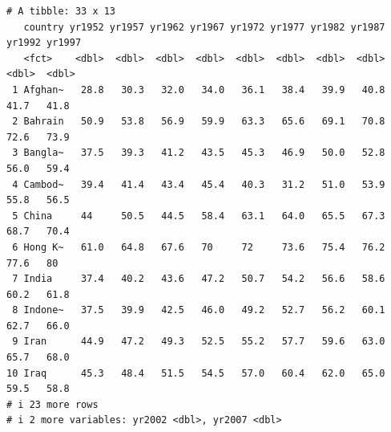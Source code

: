 \documentclass[
  letterpaper,
  DIV=11,
  numbers=noendperiod]{scrartcl}
\begin{document}
\begin{verbatim}
# A tibble: 33 x 13
   country yr1952 yr1957 yr1962 yr1967 yr1972 yr1977 yr1982 yr1987 yr1992 yr1997
   <fct>    <dbl>  <dbl>  <dbl>  <dbl>  <dbl>  <dbl>  <dbl>  <dbl>  <dbl>  <dbl>
 1 Afghan~   28.8   30.3   32.0   34.0   36.1   38.4   39.9   40.8   41.7   41.8
 2 Bahrain   50.9   53.8   56.9   59.9   63.3   65.6   69.1   70.8   72.6   73.9
 3 Bangla~   37.5   39.3   41.2   43.5   45.3   46.9   50.0   52.8   56.0   59.4
 4 Cambod~   39.4   41.4   43.4   45.4   40.3   31.2   51.0   53.9   55.8   56.5
 5 China     44     50.5   44.5   58.4   63.1   64.0   65.5   67.3   68.7   70.4
 6 Hong K~   61.0   64.8   67.6   70     72     73.6   75.4   76.2   77.6   80  
 7 India     37.4   40.2   43.6   47.2   50.7   54.2   56.6   58.6   60.2   61.8
 8 Indone~   37.5   39.9   42.5   46.0   49.2   52.7   56.2   60.1   62.7   66.0
 9 Iran      44.9   47.2   49.3   52.5   55.2   57.7   59.6   63.0   65.7   68.0
10 Iraq      45.3   48.4   51.5   54.5   57.0   60.4   62.0   65.0   59.5   58.8
# i 23 more rows
# i 2 more variables: yr2002 <dbl>, yr2007 <dbl>
\end{verbatim}
\end{document}
